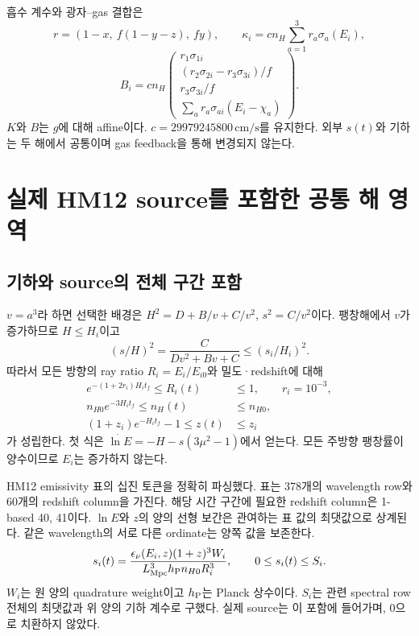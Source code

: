 \documentclass[11pt,a4paper]{article}
\numberwithin{equation}{section}
\begin{document}
흡수 계수와 광자--gas 결합은
\begin{equation}
 r=(1-x,\ f(1-y-z),\ fy),\qquad \kappa_i=cn_H\sum_{a=1}^3r_a\sigma_a(E_i),
\end{equation}
\begin{equation}
 B_i=cn_H\begin{pmatrix}
 r_1\sigma_{1i}\\(r_2\sigma_{2i}-r_3\sigma_{3i})/f\\r_3\sigma_{3i}/f\\
 \sum_a r_a\sigma_{ai}(E_i-\chi_a)
 \end{pmatrix}.
\end{equation}
$K$와 $B$는 $g$에 대해 affine이다. $c=29979245800\,\mathrm{cm/s}$를 유지한다. 외부 $s(t)$와 기하는 두 해에서 공통이며 gas feedback을 통해 변경되지 않는다.

\newpage
\section{실제 HM12 source를 포함한 공통 해 영역}
\subsection*{기하와 source의 전체 구간 포함}
$v=a^3$라 하면 선택한 배경은 $H^2=D+B/v+C/v^2$, $s^2=C/v^2$이다. 팽창해에서 $v$가 증가하므로 $H\le H_i$이고
\begin{equation}
 (s/H)^2=\frac{C}{Dv^2+Bv+C}\le(s_i/H_i)^2.
\end{equation}
따라서 모든 방향의 ray ratio $R_i=E_i/E_{i0}$와 밀도·redshift에 대해
\begin{align}
 e^{-(1+2r_i)H_it_f}\le R_i(t)&\le1,\qquad r_i=10^{-3},\\
 n_{H0}e^{-3H_it_f}\le n_H(t)&\le n_{H0},\\
 (1+z_i)e^{-H_it_f}-1\le z(t)&\le z_i
\end{align}
가 성립한다. 첫 식은 $\dot{\ln E}=-H-s(3\mu^2-1)$에서 얻는다. 모든 주방향 팽창률이 양수이므로 $E_i$는 증가하지 않는다.

HM12 emissivity 표의 십진 토큰을 정확히 파싱했다. 표는 378개의 wavelength row와 60개의 redshift column을 가진다. 해당 시간 구간에 필요한 redshift column은 1-based 40, 41이다. $\ln E$와 $z$의 양의 선형 보간은 관여하는 표 값의 최댓값으로 상계된다. 같은 wavelength의 서로 다른 ordinate는 양쪽 값을 보존한다.
\begin{equation}
 s_i(t)=\frac{\epsilon_\nu(E_i,z)(1+z)^3 W_i}
 {L_{\rm Mpc}^{3}h_{\rm P}n_{H0}R_i^3},\qquad 0\le s_i(t)\le S_i.
\end{equation}
$W_i$는 원 양의 quadrature weight이고 $h_{\rm P}$는 Planck 상수이다. $S_i$는 관련 spectral row 전체의 최댓값과 위 양의 기하 계수로 구했다. 실제 source는 이 포함에 들어가며, 0으로 치환하지 않았다.
\end{document}
